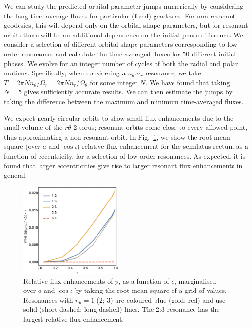 \documentclass[aps,prd,amsfonts,amssymb,amsmath,nofootinbib,showpacs,superscriptaddress,twocolumn]{revtex4}
\newcommand{\figref}[1]{Fig.~\ref{fig:#1}}
\begin{document}
We can study the predicted orbital-parameter jumps numerically by considering the long-time-average fluxes for particular (fixed) geodesics. For non-resonant geodesics, this will depend only on the orbital shape parameters, but for resonant orbits there will be an additional dependence on the initial phase difference. We consider a selection of different orbital shape parameters corresponding to low-order resonances and calculate the time-averaged fluxes for $50$ different initial phases. We evolve for an integer number of cycles of both the radial and polar motions. Specifically, when considering a $n_\theta$:$n_r$ resonance, we take $T = 2\pi N n_\theta/\Omega_r = 2\pi N n_r/\Omega_\theta$ for some integer $N$. We have found that taking $N=5$ gives sufficiently accurate results. We can then estimate the jumps by taking the difference between the maximum and minimum time-averaged fluxes.

We expect nearly-circular orbits to show small flux enhancements due to the small volume of the $r\theta$ 2-torus; resonant orbits come close to every allowed point, thus approximating a non-resonant orbit. In \figref{res-flux-rms-p}, we show the root-mean-square (over $a$ and $\cos\iota$) relative flux enhancement for the semilatus rectum as a function of eccentricity, for a selection of low-order resonances. As expected, it is found that larger eccentricities give rise to larger resonant flux enhancements in general.

\begin{figure}
\centering
\includegraphics[width=0.46\textwidth]{res_flux_rms_p}
\caption{\label{fig:res-flux-rms-p}Relative flux enhancements of $p$, as a function of $e$, marginalised over $a$ and $\cos\iota$ by taking the root-mean-square of a grid of values. Resonances with $n_\theta = 1$ ($2$; $3$) are coloured blue (gold; red) and use solid (short-dashed; long-dashed) lines. The 2:3 resonance has the largest relative flux enhancement.}
\end{figure}
\end{document}
